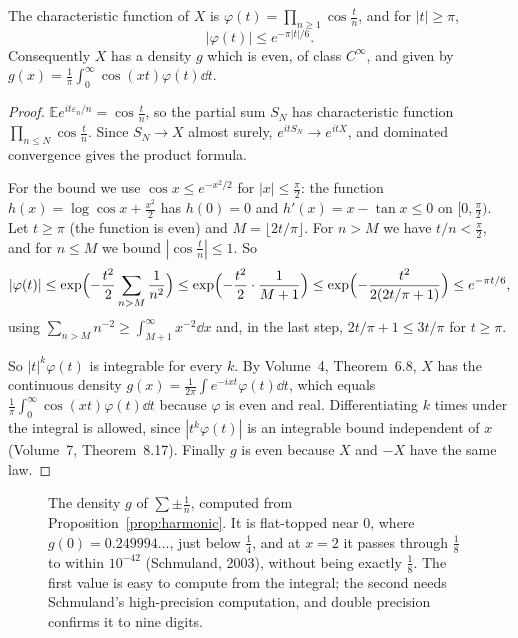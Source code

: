 \begin{proposition}\label{prop:harmonic}
The characteristic function of $X$ is $\varphi(t)=\prod_{n\ge1}\cos\frac tn$, and for $|t|\ge\pi$,
\[
|\varphi(t)|\le e^{-\pi|t|/6}.
\]
Consequently $X$ has a density $g$ which is even, of class $C^\infty$, and given by $g(x)=\frac1\pi\int_0^\infty\cos(xt)\varphi(t)\dd t$.
\end{proposition}
\begin{proof}
$\mathbb E e^{it\varepsilon_n/n}=\cos\frac tn$, so the partial sum $S_N$ has characteristic function $\prod_{n\le N}\cos\frac tn$.
Since $S_N\to X$ almost surely, $e^{itS_N}\to e^{itX}$, and dominated convergence gives the product formula.

For the bound we use $\cos x\le e^{-x^2/2}$ for $|x|\le\frac\pi2$: the function $h(x)=\log\cos x+\frac{x^2}2$ has $h(0)=0$ and
$h'(x)=x-\tan x\le0$ on $[0,\frac\pi2)$. Let $t\ge\pi$ (the function is even) and $M=\lfloor2t/\pi\rfloor$. For $n>M$ we have
$t/n<\frac\pi2$, and for $n\le M$ we bound $|\cos\frac tn|\le1$. So
\[
|\varphi(t)|\le\exp\Bigl(-\frac{t^2}2\sum_{n>M}\frac1{n^2}\Bigr)\le\exp\Bigl(-\frac{t^2}2\cdot\frac1{M+1}\Bigr)\le
\exp\Bigl(-\frac{t^2}{2(2t/\pi+1)}\Bigr)\le e^{-\pi t/6},
\]
using $\sum_{n>M}n^{-2}\ge\int_{M+1}^\infty x^{-2}\dd x$ and, in the last step, $2t/\pi+1\le3t/\pi$ for $t\ge\pi$.

So $|t|^k\varphi(t)$ is integrable for every $k$. By Volume~4, Theorem~6.8, $X$ has the continuous density
$g(x)=\frac1{2\pi}\int e^{-ixt}\varphi(t)\dd t$, which equals $\frac1\pi\int_0^\infty\cos(xt)\varphi(t)\dd t$ because $\varphi$ is even
and real. Differentiating $k$ times under the integral is allowed, since $|t^k\varphi(t)|$ is an integrable bound independent of $x$
(Volume~7, Theorem~8.17). Finally $g$ is even because $X$ and $-X$ have the same law.
\end{proof}

\begin{figure}[ht]
\centering{}
\caption{The density $g$ of $\sum\pm\frac1n$, computed from Proposition~\ref{prop:harmonic}. It is flat-topped near $0$, where
$g(0)=0.249994\ldots$, just below $\frac14$, and at $x=2$ it passes through $\frac18$ to within $10^{-42}$ (Schmuland, 2003),
without being exactly $\frac18$. The first value is easy to compute from the integral; the second needs
Schmuland's high-precision computation, and double precision confirms it to nine digits.}
\label{fig:harmonic}
\end{figure}

